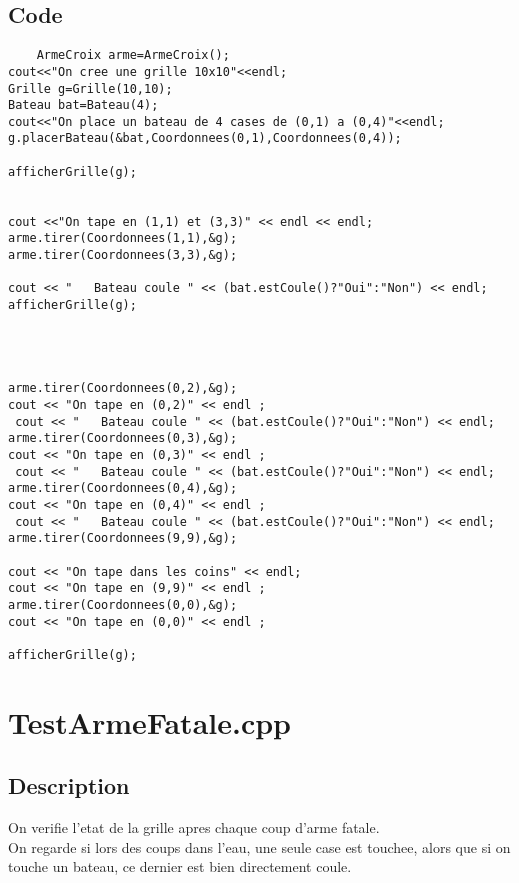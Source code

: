         \subsection{Code}
\begin{lstlisting}
	ArmeCroix arme=ArmeCroix();
cout<<"On cree une grille 10x10"<<endl;
Grille g=Grille(10,10);
Bateau bat=Bateau(4);
cout<<"On place un bateau de 4 cases de (0,1) a (0,4)"<<endl;
g.placerBateau(&bat,Coordonnees(0,1),Coordonnees(0,4));

afficherGrille(g);


cout <<"On tape en (1,1) et (3,3)" << endl << endl;
arme.tirer(Coordonnees(1,1),&g);
arme.tirer(Coordonnees(3,3),&g);

cout << "   Bateau coule " << (bat.estCoule()?"Oui":"Non") << endl;
afficherGrille(g);




arme.tirer(Coordonnees(0,2),&g);
cout << "On tape en (0,2)" << endl ; 
 cout << "   Bateau coule " << (bat.estCoule()?"Oui":"Non") << endl;
arme.tirer(Coordonnees(0,3),&g);
cout << "On tape en (0,3)" << endl ; 
 cout << "   Bateau coule " << (bat.estCoule()?"Oui":"Non") << endl;
arme.tirer(Coordonnees(0,4),&g);
cout << "On tape en (0,4)" << endl ; 
 cout << "   Bateau coule " << (bat.estCoule()?"Oui":"Non") << endl;
arme.tirer(Coordonnees(9,9),&g);

cout << "On tape dans les coins" << endl;
cout << "On tape en (9,9)" << endl ; 
arme.tirer(Coordonnees(0,0),&g);
cout << "On tape en (0,0)" << endl ; 

afficherGrille(g);
	\end{lstlisting}
    \section{TestArmeFatale.cpp}
        \subsection{Description}
            On verifie l'etat de la grille apres chaque coup d'arme fatale.\\
            On regarde si lors des coups dans l'eau, une seule case est touchee, alors que si on touche un bateau, ce dernier est bien directement coule.
